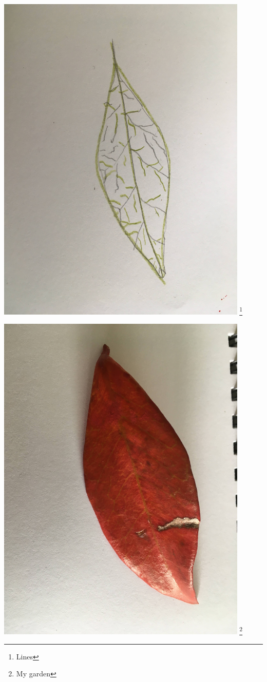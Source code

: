 \documentclass[12pt, a4paper]{article}
\begin{document}
\includegraphics[width=0.9\textwidth,height=\textheight,keepaspectratio]{leaf-lines.jpg}
\footnote{Lines}
\newpage

\includegraphics[width=0.9\textwidth,height=\textheight,keepaspectratio]{leaf-photo.jpg}
\footnote{My garden}
\newpage
\end{document}
